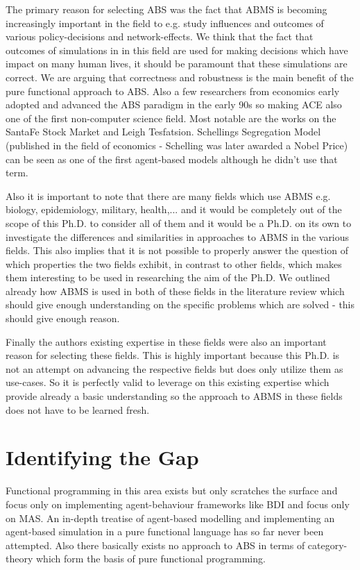 The primary reason for selecting ABS was the fact that ABMS is becoming increasingly important in the field to e.g. study influences and outcomes of various policy-decisions and network-effects. We think that the fact that outcomes of simulations in in this field are used for making decisions which have impact on many human lives, it should be paramount that these simulations are correct. We are arguing that correctness and robustness is the main benefit of the pure functional approach to ABS. Also a few researchers from economics early adopted and advanced the ABS paradigm in the early 90s so making ACE also one of the first non-computer science field. Most notable are the works on the SantaFe Stock Market and Leigh Tesfatsion. Schellings Segregation Model (published in the field of economics - Schelling was later awarded a Nobel Price) can be seen as one of the first agent-based models although he didn't use that term.
		
Also it is important to note that there are many fields which use ABMS e.g. biology, epidemiology, military, health,... and it would be completely out of the scope of this Ph.D. to consider all of them and it would be a Ph.D. on its own to investigate the differences and similarities in approaches to ABMS in the various fields.
This also implies that it is not possible to properly answer the question of which properties the two fields exhibit, in contrast to other fields, which makes them interesting to be used in researching the aim of the Ph.D. We outlined already how ABMS is used in both of these fields in the literature review which should give enough understanding on the specific problems which are solved - this should give enough reason.

Finally the authors existing expertise in these fields were also an important reason for selecting these fields. This is highly important because this Ph.D. is not an attempt on advancing the respective fields but does only utilize them as use-cases. So it is perfectly valid to leverage on this existing expertise which provide already a basic understanding so the approach to ABMS in these fields does not have to be learned fresh.
		
\section{Identifying the Gap}
Functional programming in this area exists but only scratches the surface and focus only on implementing agent-behaviour frameworks like BDI and focus only on MAS. An in-depth treatise of agent-based modelling and implementing an agent-based simulation in a pure functional language has so far never been attempted. Also there basically exists no approach to ABS in terms of category-theory which form the basis of pure functional programming.